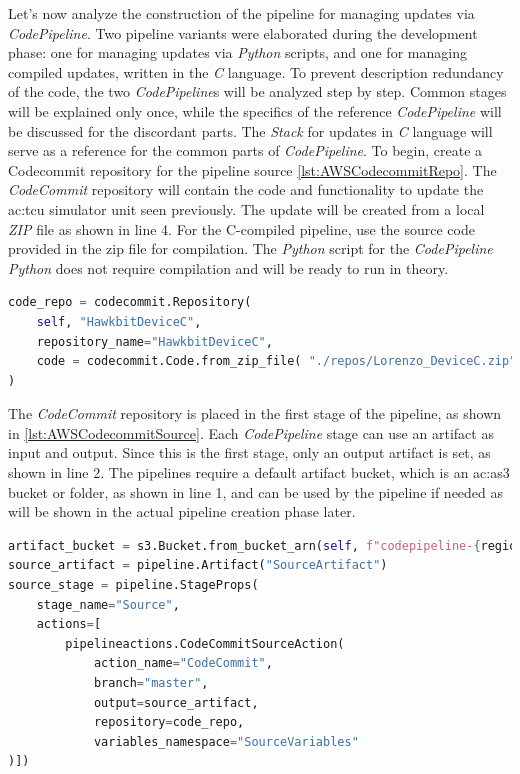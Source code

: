 Let's now analyze the construction of the pipeline for managing updates via \textit{\textit{CodePipeline}}. Two pipeline variants were elaborated during the development phase: one for managing updates via \textit{Python} scripts, and one for managing compiled updates, written in the \textit{C} language. To prevent description redundancy of the code, the two \textit{CodePipeline}s will be analyzed step by step. Common stages will be explained only once, while the specifics of the reference \textit{CodePipeline} will be discussed for the discordant parts. The \textit{Stack} for updates in \textit{C} language will serve as a reference for the common parts of \textit{CodePipeline}.
To begin, create a Codecommit repository for the pipeline source \ref{lst:AWSCodecommitRepo}. The \textit{CodeCommit} repository will contain the code and functionality to update the \gls{ac:tcu} simulator unit seen previously. The update will be created from a local \textit{ZIP} file as shown in line 4. For the C-compiled pipeline, use the source code provided in the zip file for compilation. The \textit{Python} script for the \textit{CodePipeline} \textit{Python} does not require compilation and will be ready to run in theory.
\begin{lstlisting}[language=Python, caption={\textit{CDK} Code for the creation of the \textit{TCU} simulator \textit{CodeCommit} repository}, label=lst:AWSCodecommitRepo]
code_repo = codecommit.Repository(
    self, "HawkbitDeviceC",
    repository_name="HawkbitDeviceC",
    code = codecommit.Code.from_zip_file( "./repos/Lorenzo_DeviceC.zip", "master" ) # Copies files from app directory to the repo as the initial commit
)
\end{lstlisting}

The \textit{CodeCommit} repository is placed in the first stage of the pipeline, as shown in \ref{lst:AWSCodecommitSource}. Each \textit{CodePipeline} stage can use an artifact as input and output. Since this is the first stage, only an output artifact is set, as shown in line 2. The pipelines require a default artifact bucket, which is an \gls{ac:as3} bucket or folder, as shown in line 1, and can be used by the pipeline if needed as will be shown in the actual pipeline creation phase later.
\begin{lstlisting}[language=Python, caption={\textit{CDK} code for the \textit{CodeCommit} source stage set up}, label=lst:AWSCodecommitSource]
artifact_bucket = s3.Bucket.from_bucket_arn(self, f"codepipeline-{region}-****", f"arn:aws:s3:::codepipeline-{region}-****") #default codepipeline bucket
source_artifact = pipeline.Artifact("SourceArtifact")
source_stage = pipeline.StageProps(
    stage_name="Source",
    actions=[
        pipelineactions.CodeCommitSourceAction(
            action_name="CodeCommit",
            branch="master",
            output=source_artifact,
            repository=code_repo,
            variables_namespace="SourceVariables"
)])
\end{lstlisting}

